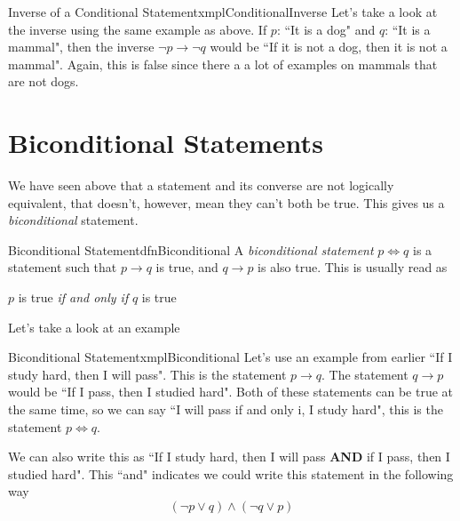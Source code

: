 \begin{exmpl}[label={exmpl:conditionalInverse}]{Inverse of a Conditional Statement}{xmplConditionalInverse}
    Let's take a look at the inverse using the same example as above. If $p$: ``It is a dog" and $q$: ``It is a mammal", then the inverse $\lnot p \to \lnot q$ would be ``If it is not a dog, then it is not a mammal". Again, this is false since there a a lot of examples on mammals that are not dogs.
\end{exmpl}

\section{Biconditional Statements}
We have seen above that a statement and its converse are not logically equivalent, that doesn't, however, mean they can't both be true. This gives us a \emph{biconditional} statement.

\begin{dfn}[label={def:biconditional}]{Biconditional Statement}{dfnBiconditional}
    A \emph{biconditional statement} $p \iff q$ is a statement such that $p \to q$ is true, and $q \to p$ is also true. This is usually read as \begin{center}
        $p$ is true \emph{if and only if} $q$ is true
    \end{center}
\end{dfn}

Let's take a look at an example

\begin{exmpl}[label={exmpl:biconditional}]{Biconditional Statement}{xmplBiconditional}
    Let's use an example from earlier ``If I study hard, then I will pass". This is the statement $p \to q$. The statement $q \to p$ would be ``If I pass, then I studied hard". Both of these statements can be true at the same time, so we can say ``I will pass if and only i, I study hard", this is the statement $p \iff q$.

    We can also write this as ``If I study hard, then I will pass \textbf{AND} if I pass, then I studied hard". This ``and" indicates we could write this statement in the following way
    $$ (\lnot p \lor q ) \land (\lnot q \lor p)$$
\end{exmpl}